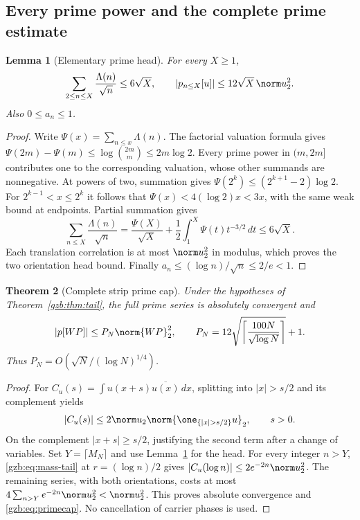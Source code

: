\documentclass[11pt,a4paper]{article}
\numberwithin{equation}{section}
\newtheorem{theorem}{Theorem}[section]
\newtheorem{lemma}[theorem]{Lemma}
\theoremstyle{definition}\newtheorem{definition}[theorem]{Definition}
\theoremstyle{remark}\newtheorem{remark}[theorem]{Remark}
\begin{document}
\subsection{Every prime power and the complete prime estimate}
\begin{lemma}[Elementary prime head]\label{gzb:lem:head}
For every $X\ge1$,
\begin{equation}\label{gzb:eq:head}
 \sum_{2\le n\le X}\frac{\Lambda(n)}{\sqrt n}\le6\sqrt X,
 \qquad |p_{n\le X}[u]|\le12\sqrt X\,\norm u_2^2.
\end{equation}
Also $0\le a_n\le1$.
\end{lemma}
\begin{proof}
Write $\Psi(x)=\sum_{n\le x}\Lambda(n)$.
The factorial valuation formula gives
$\Psi(2m)-\Psi(m)\le\log\binom{2m}{m}\le2m\log2$.
Every prime power in $(m,2m]$ contributes one to the corresponding
valuation, whose other summands are nonnegative.
At powers of two, summation gives
$\Psi(2^k)\le(2^{k+1}-2)\log2$.
For $2^{k-1}<x\le2^k$ it follows that
$\Psi(x)<4(\log2)x<3x$, with the same weak bound at endpoints.
Partial summation gives
\[
 \sum_{n\le X}\frac{\Lambda(n)}{\sqrt n}
    =\frac{\Psi(X)}{\sqrt X}
       +\frac12\int_1^X\Psi(t)t^{-3/2}\,dt\le6\sqrt X.
\]
Each translation correlation is at most $\norm u_2^2$ in modulus,
which proves the two orientation head bound.
Finally $a_n\le(\log n)/\sqrt n\le2/e<1$.
\end{proof}

\begin{theorem}[Complete strip prime cap]\label{gzb:thm:prime}
Under the hypotheses of Theorem~\ref{gzb:thm:tail}, the full prime series
is absolutely convergent and
\begin{equation}\label{gzb:eq:primecap}
 |p[WP]|\le P_N\norm{WP}_2^2,\qquad
 P_N=12\sqrt{\left\lceil\frac{100N}{\sqrt{\log N}}\right\rceil}+1.
\end{equation}
Thus $P_N=O(\sqrt N/(\log N)^{1/4})$.
\end{theorem}
\begin{proof}
For $C_u(s)=\int u(x+s)\overline{u(x)}\,dx$, splitting into
$|x|>s/2$ and its complement yields
\begin{equation}\label{gzb:eq:correlation}
 |C_u(s)|\le2\norm u_2\norm{\one_{\{|x|>s/2\}}u}_2,\qquad s>0.
\end{equation}
On the complement $|x+s|\ge s/2$, justifying the second term after
a change of variables.
Set $Y=\lceil M_N\rceil$ and use Lemma~\ref{gzb:lem:head} for the head.
For every integer $n>Y$, \eqref{gzb:eq:mass-tail} at $r=(\log n)/2$ gives
$|C_u(\log n)|\le2e^{-2n}\norm u_2^2$.
The remaining series, with both orientations, costs at most
$4\sum_{n>Y}e^{-2n}\norm u_2^2<\norm u_2^2$.
This proves absolute convergence and \eqref{gzb:eq:primecap}.
No cancellation of carrier phases is used.
\end{proof}
\end{document}
